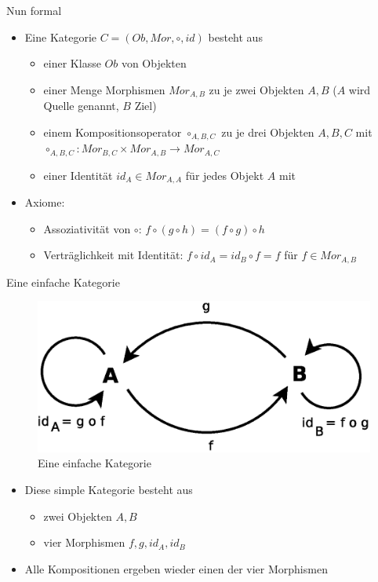 \documentclass{beamer}
\begin{document}
\begin{frame}{Nun formal}
  \begin{itemize}
  \item Eine Kategorie $C = (Ob, Mor, \circ, id)$ besteht aus  
    \begin{itemize}
    \item einer Klasse $Ob$ von Objekten
    \item einer Menge Morphismen $Mor_{A,B}$ zu je zwei Objekten $A, B$
      ($A$ wird Quelle genannt, $B$ Ziel)
    \item einem Kompositionsoperator $\circ_{A,B,C}$ zu je drei Objekten
      $A, B, C$ mit 
      $\circ_{A,B,C} : Mor_{B,C} \times Mor_{A,B} \rightarrow Mor_{A,C}$
    \item einer Identität $id_A \in Mor_{A,A}$ für jedes Objekt $A$ mit
    \end{itemize}
  \item Axiome:
    \begin{itemize}
    \item Assoziativität von $\circ$:
      $f \circ (g \circ h) = (f \circ g) \circ h$
    \item Verträglichkeit mit Identität:
      $f \circ id_A = id_B \circ f = f$ für $f \in Mor_{A,B}$
    \end{itemize}
  \end{itemize}
\end{frame}

\begin{frame}{Eine einfache Kategorie}
  \begin{figure}
    \centering
    \includegraphics[scale=0.4]{images/cat_simple}
    \caption{Eine einfache Kategorie}
  \end{figure}
  \begin{itemize}
  \item Diese simple Kategorie besteht aus
    \begin{itemize}
    \item zwei Objekten $A, B$
    \item vier Morphismen $f, g, id_A, id_B$
    \end{itemize}
  \item Alle Kompositionen ergeben wieder einen der vier Morphismen
  \end{itemize}
\end{frame}
\end{document}
